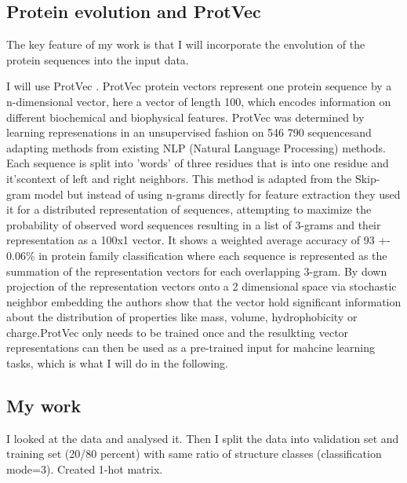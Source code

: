\documentclass{article}
\begin{document}
\subsection{Protein evolution and ProtVec}
The key feature of my work is that I will incorporate the envolution of the protein sequences into the input data.

I will use ProtVec \cite{ProtVec}. ProtVec protein vectors represent one protein sequence by a n-dimensional vector, here a vector of length 100, which encodes information on different biochemical and biophysical features. ProtVec was determined by learning represenations in an unsupervised fashion on 546 790 sequencesand adapting methods from existing NLP (Natural Language Processing) methods. Each sequence is split into 'words' of three residues that is into one residue and it'scontext of left and right neighbors. This method is adapted from the Skip-gram model but instead of using n-grams directly for feature extraction they used it for a distributed representation of sequences, attempting to maximize the probability of observed word sequences resulting in a list of 3-grams and their representation as a 100x1 vector. It shows a weighted average accuracy of 93 +- 0.06\% in protein family classification where each sequence is represented as the summation of the representation vectors for each overlapping 3-gram. By down projection of the representation vectors onto a 2 dimensional space via stochastic neighbor embedding the authors show that the vector hold significant information about the distribution of properties like mass, volume, hydrophobicity or charge.ProtVec only needs to be trained once and the resulkting vector representations can then be used as a pre-trained input for mahcine learning tasks, which is what I will do in the following.


\subsection{My work}
I looked at the data and analysed it. Then I split the data into validation set and training set (20/80 percent) with same ratio of structure classes (classification mode=3). Created 1-hot matrix.
\end{document}
